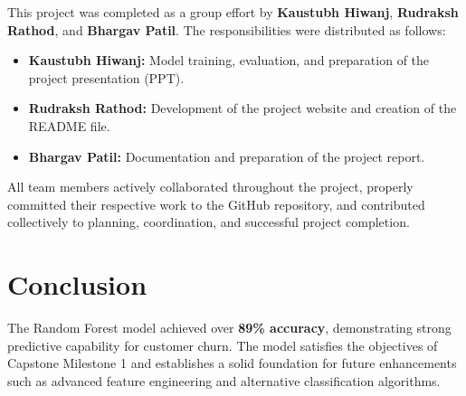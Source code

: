 \documentclass[12pt]{article}
\begin{document}
This project was completed as a group effort by \textbf{Kaustubh Hiwanj}, \textbf{Rudraksh Rathod}, and \textbf{Bhargav Patil}. The responsibilities were distributed as follows:

\begin{itemize}
    \item \textbf{Kaustubh Hiwanj:} Model training, evaluation, and preparation of the project presentation (PPT).
    \item \textbf{Rudraksh Rathod:} Development of the project website and creation of the README file.
    \item \textbf{Bhargav Patil:} Documentation and preparation of the project report.
\end{itemize}

All team members actively collaborated throughout the project, properly committed their respective work to the GitHub repository, and contributed collectively to planning, coordination, and successful project completion.

\section{Conclusion}

The Random Forest model achieved over \textbf{89\% accuracy}, demonstrating strong predictive capability for customer churn. The model satisfies the objectives of Capstone Milestone 1 and establishes a solid foundation for future enhancements such as advanced feature engineering and alternative classification algorithms.
\end{document}
